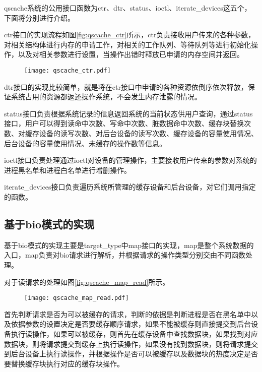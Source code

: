 qscache系统的公用接口函数为ctr、dtr、status、ioctl、iterate\_devices这五个，下面将分别进行介绍。

ctr接口的实现流程如图\ref{fig:qscache_ctr}所示，ctr负责接收用户传来的各种参数，对相关结构体进行内存的申请工作，对相关的工作队列、等待队列等进行初始化操作，以及对相关参数进行设置，当操作出错时释放已申请的内存空间并返回。

\begin{figure}[!htbp]
    \centering
    \texttt{[image: qscache\_ctr.pdf]}
\end{figure}

dtr接口的实现比较简单，就是将在ctr接口中申请的各种资源依倒序依次释放，保证系统占用的资源都返还操作系统，不会发生内存泄露的情况。

status接口负责根据系统记录的信息返回系统的当前状态供用户查询，通过status接口，用户可以得到读命中次数、写命中次数、脏数据命中次数、缓存块替换次数、对缓存设备的读写次数、对后台设备的读写次数、缓存设备的容量使用情况、后台设备的容量使用情况、未缓存的操作数等信息。

ioctl接口负责处理通过ioctl对设备的管理操作，主要接收用户传来的参数对系统的进程黑名单和进程白名单进行增删操作。

iterate\_devices接口负责遍历系统所管理的缓存设备和后台设备，对它们调用指定的函数。

\subsection{基于bio模式的实现}

基于bio模式的实现主要是target\_type中map接口的实现，map是整个系统数据的入口，map负责对bio请求进行解析，并根据请求的操作类型分别交由不同函数处理。

对于读请求的处理如图\ref{fig:qscache_map_read}所示。

\begin{figure}[!htbp]
    \centering
    \texttt{[image: qscache\_map\_read.pdf]}
\end{figure}

首先判断请求是否为可以被缓存的请求，判断的依据是判断进程是否在黑名单中以及依据参数的设置决定是否要缓存顺序请求，如果不能被缓存则直接提交到后台设备执行读操作，如果可以被缓存，则首先在缓存设备中查找数据块，如果找到对应数据块，则将请求提交到缓存上执行读操作，如果没有找到数据块，则将请求提交到后台设备上执行读操作，并根据操作是否可以被缓存以及数据块的热度决定是否要替换缓存块执行对应的缓存块操作。


